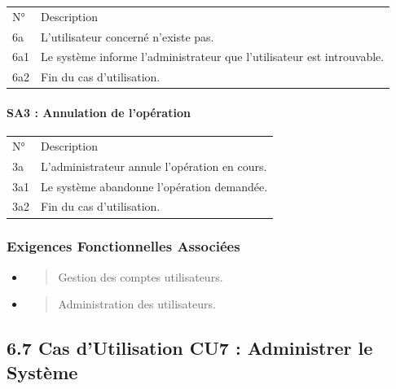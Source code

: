 \documentclass[
]{article}
\begin{document}
\begin{longtable}[]{@{}ll@{}}
\toprule
\endhead
N° & Description \\
6a & L'utilisateur concerné n'existe pas. \\
6a1 & Le système informe l'administrateur que l'utilisateur est
introuvable. \\
6a2 & Fin du cas d'utilisation. \\
\bottomrule
\end{longtable}

\hypertarget{sa3-annulation-de-lopuxe9ration-2}{%
\paragraph{SA3 : Annulation de
l'opération}\label{sa3-annulation-de-lopuxe9ration-2}}

\begin{longtable}[]{@{}ll@{}}
\toprule
\endhead
N° & Description \\
3a & L'administrateur annule l'opération en cours. \\
3a1 & Le système abandonne l'opération demandée. \\
3a2 & Fin du cas d'utilisation. \\
\bottomrule
\end{longtable}

\hypertarget{exigences-fonctionnelles-associuxe9es-5}{%
\subsubsection{Exigences Fonctionnelles
Associées}\label{exigences-fonctionnelles-associuxe9es-5}}

\begin{itemize}
\item
  \begin{quote}
  Gestion des comptes utilisateurs.
  \end{quote}
\item
  \begin{quote}
  Administration des utilisateurs.
  \end{quote}
\end{itemize}

\hypertarget{cas-dutilisation-cu7-administrer-le-systuxe8me}{%
\subsection{6.7 Cas d'Utilisation CU7 : Administrer le
Système}\label{cas-dutilisation-cu7-administrer-le-systuxe8me}}
\end{document}
